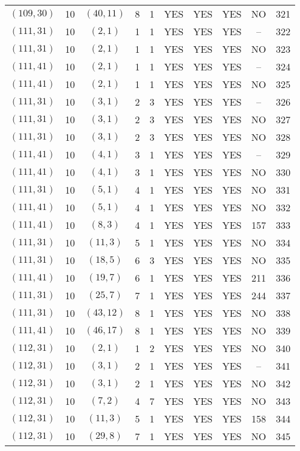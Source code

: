 \begin{longtable}{|c|c|c|c|c|c|c|c|c|c|}
$(109, 30)$ & 10 & $(40, 11)$ & 8 & 1 & YES & YES & YES & NO & 321\\
$(111, 31)$ & 10 & $(2, 1)$ & 1 & 1 & YES & YES & YES & -- & 322\\
$(111, 31)$ & 10 & $(2, 1)$ & 1 & 1 & YES & YES & YES & NO & 323\\
$(111, 41)$ & 10 & $(2, 1)$ & 1 & 1 & YES & YES & YES & -- & 324\\
$(111, 41)$ & 10 & $(2, 1)$ & 1 & 1 & YES & YES & YES & NO & 325\\
$(111, 31)$ & 10 & $(3, 1)$ & 2 & 3 & YES & YES & YES & -- & 326\\
$(111, 31)$ & 10 & $(3, 1)$ & 2 & 3 & YES & YES & YES & NO & 327\\
$(111, 31)$ & 10 & $(3, 1)$ & 2 & 3 & YES & YES & YES & NO & 328\\
$(111, 41)$ & 10 & $(4, 1)$ & 3 & 1 & YES & YES & YES & -- & 329\\
$(111, 41)$ & 10 & $(4, 1)$ & 3 & 1 & YES & YES & YES & NO & 330\\
$(111, 31)$ & 10 & $(5, 1)$ & 4 & 1 & YES & YES & YES & NO & 331\\
$(111, 41)$ & 10 & $(5, 1)$ & 4 & 1 & YES & YES & YES & NO & 332\\
$(111, 41)$ & 10 & $(8, 3)$ & 4 & 1 & YES & YES & YES & 157 & 333\\
$(111, 31)$ & 10 & $(11, 3)$ & 5 & 1 & YES & YES & YES & NO & 334\\
$(111, 31)$ & 10 & $(18, 5)$ & 6 & 3 & YES & YES & YES & NO & 335\\
$(111, 41)$ & 10 & $(19, 7)$ & 6 & 1 & YES & YES & YES & 211 & 336\\
$(111, 31)$ & 10 & $(25, 7)$ & 7 & 1 & YES & YES & YES & 244 & 337\\
$(111, 31)$ & 10 & $(43, 12)$ & 8 & 1 & YES & YES & YES & NO & 338\\
$(111, 41)$ & 10 & $(46, 17)$ & 8 & 1 & YES & YES & YES & NO & 339\\
$(112, 31)$ & 10 & $(2, 1)$ & 1 & 2 & YES & YES & YES & NO & 340\\
$(112, 31)$ & 10 & $(3, 1)$ & 2 & 1 & YES & YES & YES & -- & 341\\
$(112, 31)$ & 10 & $(3, 1)$ & 2 & 1 & YES & YES & YES & NO & 342\\
$(112, 31)$ & 10 & $(7, 2)$ & 4 & 7 & YES & YES & YES & NO & 343\\
$(112, 31)$ & 10 & $(11, 3)$ & 5 & 1 & YES & YES & YES & 158 & 344\\
$(112, 31)$ & 10 & $(29, 8)$ & 7 & 1 & YES & YES & YES & NO & 345\\

\end{longtable}
